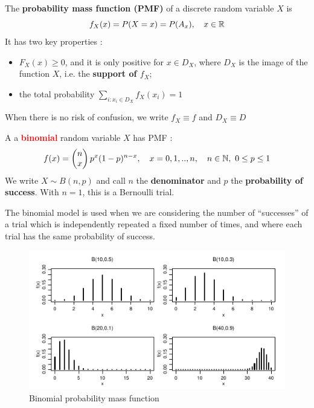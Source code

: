 \documentclass[12pt,a4paper]{article}
\begin{document}
\begin{boite}
     The \textbf{probability mass function (PMF)} of a discrete random variable $X$ is
    \begin{equation}
        f_X(x) = P(X=x)=P(A_x),\quad x\in \mathbb{R}
    \end{equation}
    It has two key properties : 
    \begin{itemize}
        \item $F_X(x) \geq 0$, and it is only positive for $x \in D_X$, where $D_X$ is the image of the function $X$, i.e. the \textbf{support of $f_X$};
        \item the total probability $\sum_{i:x_i \in D_X}^{}f_X(x_i)=1$
    \end{itemize}
    When there is no risk of confusion, we write $f_X \equiv f$ and $D_X \equiv D$
\end{boite}
\begin{boite}
     A  a \textbf{\textcolor{red}{binomial}} random variable $X$ has PMF :
\begin{equation}
    f(x) = \begin{pmatrix} n \\ x \end{pmatrix} p^x(1-p)^{n-x},\quad x = 0,1,..,n,\quad n \in \mathbb{N},\ 0\leq p \leq 1
    \label{equ:distribution_binomial}
\end{equation}
We write $X \sim B(n,p)$ and call $n$ the \textbf{denominator} and $p$ the \textbf{probability of success}. With $n =1$, this is a Bernoulli trial.
\begin{blackbox}
    The binomial model is used when we are considering the number of ``successes'' of a trial which is independently repeated a fixed number of times, and where each trial has the same probability of success.
\end{blackbox}
\end{boite}
\begin{figure}
    \centering
    \includegraphics[scale=0.75]{images/binomial_pmf} 
    \caption{Binomial probability mass function}
    \label{fig: binomial pmf}
\end{figure}
\end{document}
